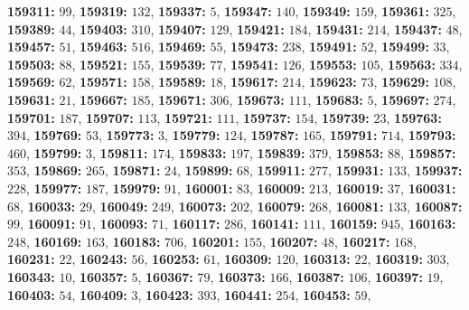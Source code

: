 \textsf{\bfseries 159311:} $99$, \textsf{\bfseries 159319:} $132$, \textsf{\bfseries 159337:} $5$, \textsf{\bfseries 159347:} $140$, \textsf{\bfseries 159349:} $159$, \textsf{\bfseries 159361:} $325$, \textsf{\bfseries 159389:} $44$, \textsf{\bfseries 159403:} $310$, \textsf{\bfseries 159407:} $129$, \textsf{\bfseries 159421:} $184$, \textsf{\bfseries 159431:} $214$, \textsf{\bfseries 159437:} $48$, \textsf{\bfseries 159457:} $51$, \textsf{\bfseries 159463:} $516$, \textsf{\bfseries 159469:} $55$, \textsf{\bfseries 159473:} $238$, \textsf{\bfseries 159491:} $52$, \textsf{\bfseries 159499:} $33$, \textsf{\bfseries 159503:} $88$, \textsf{\bfseries 159521:} $155$, \textsf{\bfseries 159539:} $77$, \textsf{\bfseries 159541:} $126$, \textsf{\bfseries 159553:} $105$, \textsf{\bfseries 159563:} $334$, \textsf{\bfseries 159569:} $62$, \textsf{\bfseries 159571:} $158$, \textsf{\bfseries 159589:} $18$, \textsf{\bfseries 159617:} $214$, \textsf{\bfseries 159623:} $73$, \textsf{\bfseries 159629:} $108$, \textsf{\bfseries 159631:} $21$, \textsf{\bfseries 159667:} $185$, \textsf{\bfseries 159671:} $306$, \textsf{\bfseries 159673:} $111$, \textsf{\bfseries 159683:} $5$, \textsf{\bfseries 159697:} $274$, \textsf{\bfseries 159701:} $187$, \textsf{\bfseries 159707:} $113$, \textsf{\bfseries 159721:} $111$, \textsf{\bfseries 159737:} $154$, \textsf{\bfseries 159739:} $23$, \textsf{\bfseries 159763:} $394$, \textsf{\bfseries 159769:} $53$, \textsf{\bfseries 159773:} $3$, \textsf{\bfseries 159779:} $124$, \textsf{\bfseries 159787:} $165$, \textsf{\bfseries 159791:} $714$, \textsf{\bfseries 159793:} $460$, \textsf{\bfseries 159799:} $3$, \textsf{\bfseries 159811:} $174$, \textsf{\bfseries 159833:} $197$, \textsf{\bfseries 159839:} $379$, \textsf{\bfseries 159853:} $88$, \textsf{\bfseries 159857:} $353$, \textsf{\bfseries 159869:} $265$, \textsf{\bfseries 159871:} $24$, \textsf{\bfseries 159899:} $68$, \textsf{\bfseries 159911:} $277$, \textsf{\bfseries 159931:} $133$, \textsf{\bfseries 159937:} $228$, \textsf{\bfseries 159977:} $187$, \textsf{\bfseries 159979:} $91$, \textsf{\bfseries 160001:} $83$, \textsf{\bfseries 160009:} $213$, \textsf{\bfseries 160019:} $37$, \textsf{\bfseries 160031:} $68$, \textsf{\bfseries 160033:} $29$, \textsf{\bfseries 160049:} $249$, \textsf{\bfseries 160073:} $202$, \textsf{\bfseries 160079:} $268$, \textsf{\bfseries 160081:} $133$, \textsf{\bfseries 160087:} $99$, \textsf{\bfseries 160091:} $91$, \textsf{\bfseries 160093:} $71$, \textsf{\bfseries 160117:} $286$, \textsf{\bfseries 160141:} $111$, \textsf{\bfseries 160159:} $945$, \textsf{\bfseries 160163:} $248$, \textsf{\bfseries 160169:} $163$, \textsf{\bfseries 160183:} $706$, \textsf{\bfseries 160201:} $155$, \textsf{\bfseries 160207:} $48$, \textsf{\bfseries 160217:} $168$, \textsf{\bfseries 160231:} $22$, \textsf{\bfseries 160243:} $56$, \textsf{\bfseries 160253:} $61$, \textsf{\bfseries 160309:} $120$, \textsf{\bfseries 160313:} $22$, \textsf{\bfseries 160319:} $303$, \textsf{\bfseries 160343:} $10$, \textsf{\bfseries 160357:} $5$, \textsf{\bfseries 160367:} $79$, \textsf{\bfseries 160373:} $166$, \textsf{\bfseries 160387:} $106$, \textsf{\bfseries 160397:} $19$, \textsf{\bfseries 160403:} $54$, \textsf{\bfseries 160409:} $3$, \textsf{\bfseries 160423:} $393$, \textsf{\bfseries 160441:} $254$, \textsf{\bfseries 160453:} $59$, 
